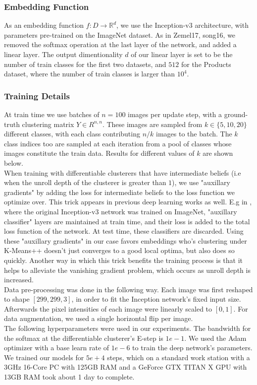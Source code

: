 \subsubsection{Embedding Function}
As an embedding function $f:D\rightarrow \mathbb{R}^d$, we use the Inception-v3 \cite{greenwade93} architecture, with parameters pre-trained on the ImageNet\cite{greenwade93} dataset. As in Zemel17, song16, we removed the softmax operation at the last layer of the network, and added a linear layer. The output dimentionality $d$ of our linear layer is set to be the number of train classes for the first two datasets, and $512$ for the Products dataset, where the number of train classes is larger than $10^4$.\\

\subsubsection{Training Details}
At train time we use batches of $n=100$ images per update step, with a ground-truth clustering matrix $Y\in R^{n,n}$. These images are sampled from $k\in{\{5,10,20\}}$ different classes, with each class contributing $n/k$ images to the batch. The $k$ class indices too are sampled at each iteration from a pool of classes whose images constitute the train data. Results for different values of $k$ are shown below.\\
When training with differentiable clusterers that have intermediate beliefs (i.e when the unroll depth of the clusterer is greater than $1$), we use "auxillary gradients" by adding the loss for intermediate beliefs to the loss function we optimize over. This trick appears in previous deep learning works as well. E.g in \cite{greenwade93}, where the original Inception-v3 network was trained on ImageNet, "auxillary classifier" layers are maintained at train time, and their loss is added to the total loss function of the network. At test time, these classifiers are discarded. Using these "auxillary gradients" in our case favors embeddings who's clustering under K-Means++ doesn't just converges to a good local optima, but also does so quickly. Another way in which this trick benefits the training process is that it helps to alleviate the vanishing gradient problem\cite{greenwade93}, which occurs as unroll depth is increased.\\ %
Data pre-processing was done in the following way. Each image was first reshaped to shape $[299,299,3]$, in order to fit the Inception network's fixed input size. Afterwards the pixel intensities of each image were linearly scaled to $[0,1]$. For data augmentation, we used a single horizontal flip per image.\\
The following hyperparameters were used in our experiments. The bandwidth for the softmax at the differentiable clusterer's E-step is $1e-1$. We used the Adam \cite{} optimizer with a base learn rate of $1e-6$ to train the deep network's parameters.
We trained our models for $5e+4$ steps, which on a standard work station with a 3GHz 16-Core PC with 125GB RAM and a GeForce GTX TITAN X GPU with 13GB RAM took about 1 day to complete. 
